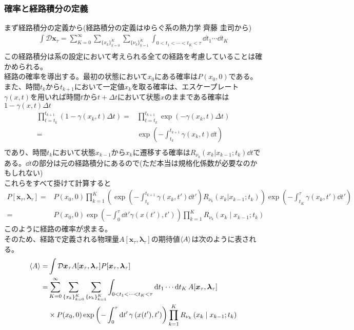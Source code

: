 \documentclass{ltjsarticle}
\begin{document}
\subsubsection{確率と経路積分の定義}
まず経路積分の定義から(経路積分の定義はゆらぐ系の熱力学 齊藤 圭司から)\\
\begin{align}
  \int \mathcal{D}\bm{x}_\tau=\sum_{K=0}^{\infty}\sum_{\lbrace x_k\rbrace_{k=0}^K}\sum_{\lbrace\nu_k\rbrace_{k=1}^K}\int_{0<t_1<\cdots<t_K<\tau}\dd{t_1}\cdots \dd{t_K}\\
\end{align}
この経路積分は系の設定において考えられる全ての経路を考慮していることは確かめられる。\\
経路の確率を導出する。最初の状態において$x_0$にある確率は$P(x_0,0)$である。また、時間$t_{k}$から$t_{k+1}$において一定値$x_k$を取る確率は、エスケープレート$\gamma(x,t)$を用いれば時間$t$から$t+\Delta{t}$において状態$x$のままである確率は$1-\gamma(x,t)\Delta{t}$
\begin{align}
  \prod_{t=t_k}^{t_{k+1}}(1-\gamma(x_k,t)\Delta{t})=&\prod_{t=t_k}^{t_{k+1}}\exp\left(-\gamma(x_k,t)\Delta{t}\right)\\
  =&\exp\left(-\int_{t_k}^{t_{k+1}}\gamma(x_k,t)\dd{t}\right)\\
\end{align}
であり、時間$t_k$において状態$x_{k-1}$から$x_k$に遷移する確率は$R_{\nu_k}(x_k|x_{k-1};t_k)\dd{t}$である。$\dd{t}$の部分は元の経路積分にあるので(ただ本当は規格化係数が必要なのかもしれない)\\
これらをすべて掛けて計算すると
\begin{align}
  P[\bm{x}_\tau,\bm{\lambda}_\tau]
  =&P(x_0,0)\prod_{k=1}^K \left( \exp\left(-\int_{t_k}^{t_{k+1}}\gamma(x_k,t')\dd{t'}\right)R_{\nu_k}(x_k|x_{k-1};t_k) \right)\exp\left(-\int_{t_K}^{\tau}\gamma(x_k,t')\dd{t'}\right) \\
  =&P(x_0,0)\exp\left(-\int_0^\tau \dd{t'}\gamma\left(x(t'),t'\right)\right)\prod_{k=1}^K R_{\nu_k}\left(x_k\mid x_{k-1};t_k\right)
\end{align}
このように経路の確率が求まる。\\
そのため、経路で定義される物理量$A[\bm{x}_\tau,\bm{\lambda}_\tau]$の期待値$\ev{A}$は次のように表される。
\begin{align}
  \ev{A}=&\int \mathcal{D}\bm{x}_\tau A[\bm{x}_\tau,\bm{\lambda}_\tau]P[\bm{x}_\tau,\bm{\lambda}_\tau]\\
  =&\sum_{K=0}^{\infty}\sum_{\lbrace x_k\rbrace_{k=0}^K}\sum_{\lbrace\nu_k\rbrace_{k=1}^K}\int_{0<t_1<\cdots<t_K<\tau}\dd{t_1}\cdots \dd{t_K}A[\bm{x}_\tau,\bm{\lambda}_\tau]\\
  &\times P(x_0,0)\exp\left(-\int_0^\tau \dd{t'}\gamma\left(x(t'),t'\right)\right)\prod_{k=1}^K R_{\nu_k}\left(x_k\mid x_{k-1};t_k\right)\\
\end{align}
\end{document}
